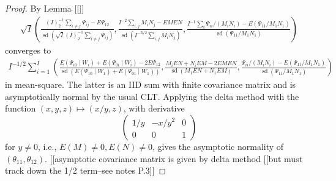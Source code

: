 \message{ !name(manuscript.tex)}\documentclass[12pt]{article}
\DeclareMathOperator{\AUC}{AUC}
\DeclareMathOperator{\sd}{sd}
\newcommand{\I}{I}
\newcommand{\E}{E}
\newcommand{\cind}{\perp \!\!\! \perp}
\newcommand{\aucindiv}{\theta_{11}}%
\newcommand{\aucpop}{\theta_{12}}%
\newcommand{\Kernel}{\Psi}
\newcommand{\W}{W}
\begin{document}
\begin{proof}%

  By Lemma [[]]
  \begin{align}
    \sqrt{\I}\left(
    \frac{(\I)_2^{-1}\sum_{i\neq j}\Kernel_{ij}-\E\Kernel_{12}}{\sd(\sqrt{\I}(\I)_2^{-1}\sum_{i\neq j}\Kernel_{ij})}
    ,        
    \frac{\I^{-2}\sum_{i,j}M_iN_j - \E M\E N}
    {\sd(\I^{-3/2}\sum_{i, j}M_iN_j ) }
    ,
     \frac{\I^{-1}\sum_i \Kernel_{ii}/(M_iN_i) - \E(\Kernel_{11}/M_1N_1)}
     {\sd(\Kernel_{11}/M_1N_1)}
    \right)
  \end{align}
  converges to
  \begin{align}
    \I^{-1/2}\sum_{i=1}^\I\left(
     \frac{\E(\Kernel_{i0}\mid\W_i)+\E(\Kernel_{0i}\mid\W_i)-2\E\Kernel_{12}}
    {\sd(\E(\Kernel_{10}\mid\W_1)+\E(\Kernel_{01}\mid\W_1))}
    ,
     \frac{M_i\E N + N_i\E M - 2\E M\E N}
     {\sd(M_1\E N + N_1\E M)} 
     ,
     \frac{ \Kernel_{ii}/(M_iN_i) - \E(\Kernel_{11}/M_1N_1)}
    {\sd(\Kernel_{11}/M_1N_1)}
    \right)
  \end{align}
  in mean-square. The latter is an IID sum with finite covariance matrix and is asymptotically normal by the usual CLT.
  Applying the delta method with the function
  $(x,y,z)\mapsto (x/y,z)$, with derivative
  $$
  \begin{pmatrix}
    1/y & -x/y^2 & 0 \\
    0 & 0 & 1
  \end{pmatrix}
  $$
  for $y\neq 0$, i.e., $E(M)\neq 0, E(N)\neq 0$, gives the asymptotic normality of $(\aucindiv,\aucpop)$.
  [[asymptotic covariance matrix is given by delta method [[but must track down the 1/2 term--see notes P.3]]


  

  



\end{proof}
\end{document}
